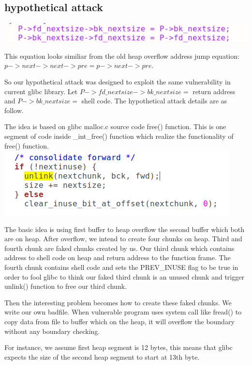 \documentclass[12pt]{article}
\begin{document}
\subsection{hypothetical attack}

\includegraphics[scale=0.5]{rm_linklist.png}

This equation looks similiar from the old heap overflow address jump equation:\\$p->next->next->pre = p->next->pre$. 

So our hypothetical attack was designed to exploit the same vulnerability in current glibc library. Let $P->fd\_nextsize->bk\_nextsize =$ return address and $P->bk\_nextsize=$ shell code. The hypothetical attack details are as follow.   

The idea is based on glibc malloc.c source code free() function. This is one segment of code inside \_int\_free() function which realize the functionality of free() function. \\
\includegraphics[scale=0.5]{unlink_next_free_chunk.png}

The basic idea is using first buffer to heap overflow the second buffer which both are on heap. After overflow, we intend to create four chunks on heap. Third and fourth chunk are faked chunks created by us. Our third chunk which contains address to shell code on heap and return address to the function frame. The fourth chunk contains shell code and sets the PREV\_INUSE flag to be true in order to fool glibc to think our faked third chunk is an unused chunk and trigger unlink() function to free our third chunk.  

Then the interesting problem becomes how to create these faked chunks. We write our own badfile. When vulnerable program uses system call like fread() to copy data from file to buffer which on the heap, it will overflow the boundary without any boundary checking.

For instance, we assume first heap segment is 12 bytes, this means that glibc expects the size of the second heap segment to start at 13th byte.
\end{document}
